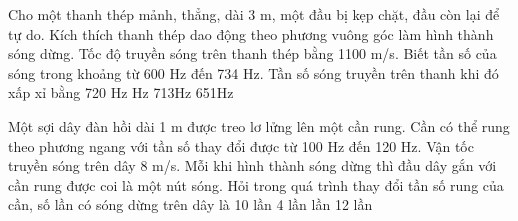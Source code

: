\begin{ex}%
Cho một thanh thép mảnh, thẳng, dài 3 m, một đầu bị kẹp chặt, đầu còn lại để tự do. Kích thích thanh thép dao động theo phương vuông góc làm hình thành sóng dừng. Tốc độ truyền sóng trên thanh thép bằng 1100 m/s. Biết tần số của sóng trong khoảng từ 600 Hz đến 734 Hz. Tần số sóng truyền trên thanh khi đó xấp xỉ bằng
\choice
{720 Hz}
{ Hz}
{713Hz}
{651Hz}
\end{ex} 
\begin{ex}%
Một sợi dây đàn hồi dài 1 m được treo lơ lửng lên một cần rung. Cần có thể rung theo phương ngang với tần số thay đổi được từ 100 Hz đến 120 Hz. Vận tốc truyền sóng trên dây 8 m/s. Mỗi khi hình thành sóng dừng thì đầu dây gắn với cần rung được coi là một nút sóng. Hỏi trong quá trình thay đổi tần số rung của cần, số lần có sóng dừng trên dây là
\choice
{10 lần}
{4 lần}
{ lần}
{12 lần}
\end{ex} 

